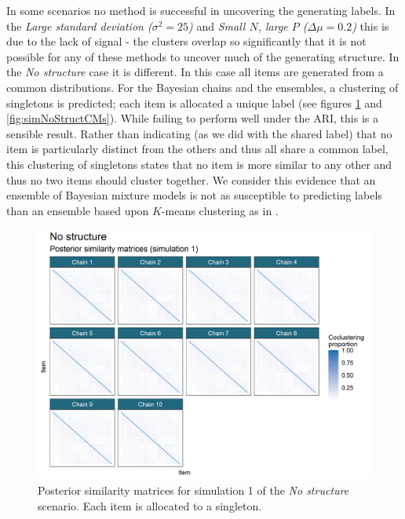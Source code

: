 \documentclass[]{article}
\begin{document}
In some scenarios no method is successful in uncovering the generating labels. In the \emph{Large standard deviation ($\sigma^2 =25$)} and \emph{Small $N$, large $P$ ($\Delta \mu = 0.2$)} this is due to the lack of signal - the clusters overlap so significantly that it is not possible for any of these methods to uncover much of the generating structure. In the \emph{No structure} case it is different. In this case all items are generated from a common distributions. For the Bayesian chains and the ensembles, a clustering of singletons is predicted; each item is allocated a unique label (see figures \ref{fig:simNoStructPSMs} and \ref{fig:simNoStructCMs}). While failing to perform well under the ARI, this is a sensible result. Rather than indicating (as we did with the shared label) that no item is particularly distinct from the others and thus all share a common label, this clustering of singletons states that no item is more similar to any other and thus no two items should cluster together. We consider this evidence that an ensemble of Bayesian mixture models is not as susceptible to predicting labels than an ensemble based upon $K$-means clustering as in \cite{senbabaoglu2014reassessment,senbabaouglu2014critical}.

\begin{figure} %
	\centering
	\includegraphics[scale=0.65]{./Images/Simulations/PSMs/no_structureSim1.png}
	\caption{Posterior similarity matrices for simulation 1 of the \emph{No structure} scenario. Each item is allocated to a singleton.}
	\label{fig:simNoStructPSMs}
\end{figure}
\end{document}
